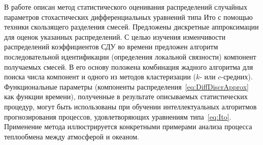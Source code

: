 В работе описан метод статистического оценивания распределений случайных параметров стохастических дифференциальных уравнений типа Ито с помощью техники скользящего разделения смесей. Предложены дискретные аппроксимации для оценок указанных распределений. С целью изучения изменчивости распределений коэффициентов СДУ во времени предложен алгоритм последовательной идентификации (определения локальной связности) компонент получаемых смесей. В его основу положена комбинация жадного алгоритма для поиска числа компонент и одного из методов кластеризации ($k$- или $c$-средних). Функциональные параметры (компоненты распределения~\eqref{eq:DiffDiscrApprox} как функции времени), полученные в результате описываемых статистических процедур, могут быть использованы при обучении интеллектуальных алгоритмов прогнозирования процессов, удовлетворяющих уравнениям типа~\eqref{eq:Ito}. Применение метода иллюстрируется конкретными примерами анализа процесса теплообмена между атмосферой и океаном.
